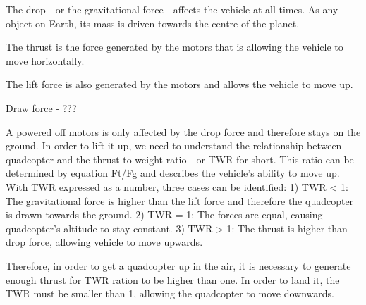 The drop - or the gravitational force - affects the vehicle at all times. As any object on Earth, its mass is driven towards the centre of the planet.

The thrust is the force generated by the motors that is allowing the vehicle to move horizontally.

The lift force is also generated by the motors and allows the vehicle to move up.

Draw force - ???

A powered off motors is only affected by the drop force and therefore stays on the ground. In order to lift it up, we need to understand the relationship between quadcopter and the thrust to weight ratio - or TWR for short. This ratio can be determined by equation Ft/Fg and describes the vehicle's ability to move up. With TWR expressed as a number, three cases can be identified:
1) TWR < 1: The gravitational force is higher than the lift force and therefore the quadcopter is drawn towards the ground.
2) TWR = 1: The forces are equal, causing quadcopter's altitude to stay constant.
3) TWR > 1: The thrust is higher than drop force, allowing vehicle to move upwards.

Therefore, in order to get a quadcopter up in the air, it is necessary to generate enough thrust for TWR ration to be higher than one. In order to land it, the TWR must be smaller than 1, allowing the quadcopter to move downwards.



